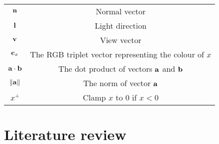 \begin{center}
	\begin{tabular}{ c c }
		\hline
		\begin{math}\mathbf{n}\end{math} & Normal vector \\
		\begin{math}\mathbf{l}\end{math} & Light direction \\
		\begin{math}\mathbf{v}\end{math} & View vector \\
		\begin{math}\mathbf{c}_{x}\end{math} & The RGB triplet vector representing the colour of \begin{math}x\end{math}\\
		\begin{math}\mathbf{a}\cdot\mathbf{b}\end{math} & The dot product of vectors \begin{math}\mathbf{a}\end{math} and \begin{math}\mathbf{b}\end{math} \\
		\begin{math}\norm{\mathbf{a}}\end{math} & The norm of vector \begin{math}\mathbf{a}\end{math} \\
		\begin{math}x^+\end{math} & Clamp \begin{math}x\end{math} to \begin{math}0\end{math} if \begin{math}x<0\end{math} \\
		\hline
	\end{tabular}
\end{center}

\section{Literature review}

